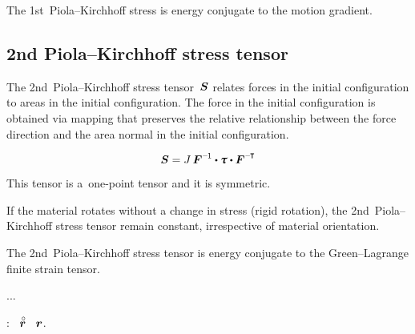 The 1st~Piola\hbox{--}Kirchhoff stress is energy conjugate to the motion gradient.

\subsection*{2nd Piola\hbox{--}Kirchhoff stress tensor}

The 2nd~Piola\hbox{--}Kirchhoff stress tensor~$\bm{S}$ relates forces in the initial configuration to areas in the initial configuration.
The force in the initial configuration is obtained via mapping that preserves the relative relationship between the force direction and the area normal in the initial configuration.

\noindent\vspace{-0.2em}\begin{equation*}
\secondpiolakirchhoffstress = J \, \bm{F}^{\expminusone} \dotp \cauchystress \dotp \bm{F}^{\expminusT}
\end{equation*}

This tensor is a~one\hbox{-}point tensor and it is symmetric.

If the material rotates without a change in stress (rigid rotation), the 2nd~Piola\hbox{--}Kirchhoff stress tensor remain constant, irrespective of material orientation.

The 2nd~Piola\hbox{--}Kirchhoff stress tensor is energy conjugate to the Green\hbox{--}Lagrange finite strain tensor.

...

\newpage



\label{para:variationofconfiguration}

  :  ~$\initiallocationvector$   ~$\bm{r}$.

